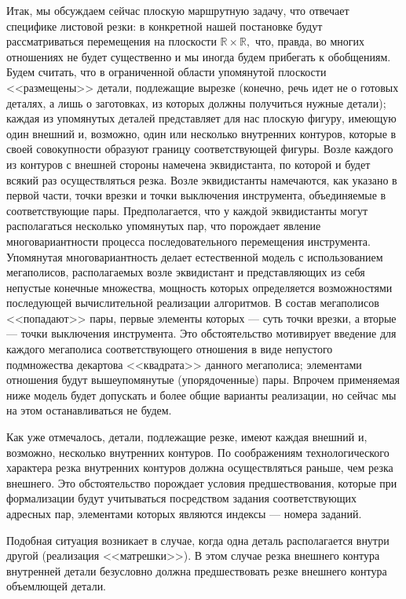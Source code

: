 \documentclass[11pt,twoside,openany]{report}
\newcommand{\bbr}{{\mathbb R}}
\begin{document}
Итак, мы обсуждаем сейчас плоскую маршрутную задачу, что отвечает специфике
листовой резки: в конкретной нашей постановке будут рассматриваться перемещения
на плоскости $\bbr \times \bbr,$ что, правда, во многих отношениях не будет
существенно и мы иногда будем прибегать к обобщениям. Будем считать, что в
ограниченной области упомянутой плоскости <<размещены>> детали, подлежащие вырезке
(конечно, речь идет не о готовых деталях, а лишь о заготовках, из которых должны
получиться нужные детали); каждая из упомянутых деталей представляет для нас
плоскую фигуру, имеющую один внешний и, возможно, один или несколько внутренних
контуров, которые в своей совокупности образуют границу соответствующей фигуры.
Возле каждого из контуров с внешней стороны намечена эквидистанта, по которой и
будет всякий раз осуществляться резка. Возле эквидистанты намечаются, как указано
в первой части, точки врезки и точки выключения инструмента, объединяемые в
соответствующие пары. Предполагается, что у каждой эквидистанты могут располагаться
несколько упомянутых пар, что порождает явление многовариантности процесса
последовательного перемещения инструмента. Упомянутая многовариантность делает
естественной модель с использованием мегаполисов, располагаемых возле эквидистант
и представляющих из себя непустые конечные множества, мощность которых определяется
возможностями последующей вычислительной реализации алгоритмов. В состав мегаполисов
<<попадают>> пары, первые элементы которых --- суть точки врезки, а вторые --- точки
выключения инструмента. Это обстоятельство мотивирует введение для каждого мегаполиса
соответствующего отношения в виде непустого подмножества декартова <<квадрата>> данного
мегаполиса; элементами отношения будут вышеупомянутые (упорядоченные) пары. Впрочем
применяемая ниже модель будет допускать и более общие варианты реализации, но сейчас
мы на этом останавливаться не будем.

Как уже отмечалось, детали, подлежащие резке, имеют каждая внешний и, возможно,
несколько внутренних контуров. По соображениям технологического характера резка
внутренних контуров должна осуществляться раньше, чем резка внешнего. Это
обстоятельство порождает условия предшествования, которые при формализации
будут учитываться посредством задания соответствующих адресных пар, элементами
которых являются индексы --- номера заданий.

Подобная ситуация возникает в случае, когда одна деталь располагается внутри
другой (реализация <<матрешки>>). В этом случае резка внешнего контура внутренней
детали безусловно должна предшествовать резке внешнего контура объемлющей детали.
\end{document}
